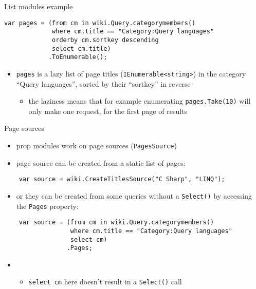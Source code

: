 \documentclass{beamer}
\begin{document}
\begin{frame}[fragile]{List modules example}
\begin{adjustbox}{width=\textwidth,keepaspectratio}
\begin{lstlisting}
var pages = (from cm in wiki.Query.categorymembers()
             where cm.title == "Category:Query languages"
             orderby cm.sortkey descending
             select cm.title)
            .ToEnumerable();
\end{lstlisting}
\end{adjustbox}

\medskip

\begin{itemize}
\item \lstinline{pages} is a lazy list of page titles (\lstinline{IEnumerable<string>}) in the category ``Query languages'', sorted by their ``sortkey'' in reverse
\begin{itemize}
\item the laziness means that for example enumerating \lstinline{pages.Take(10)} will only make one request, for the first page of results
\end{itemize}
\end{itemize}
\end{frame}

\begin{frame}[fragile]{Page sources}
\begin{itemize}
\item prop modules work on page sources (\lstinline{PagesSource})
\item page source can be created from a static list of pages:
\end{itemize}
\begin{adjustbox}{scale=0.7}
\begin{lstlisting}
    var source = wiki.CreateTitlesSource("C Sharp", "LINQ");
\end{lstlisting}
\end{adjustbox}
\begin{itemize}
\item or they can be created from some queries without a \lstinline{Select()}
by accessing the \lstinline{Pages} property:
\end{itemize}
\begin{adjustbox}{scale=0.7}
\begin{lstlisting}
    var source = (from cm in wiki.Query.categorymembers()
                  where cm.title == "Category:Query languages"
                  select cm)
                 .Pages;
\end{lstlisting}
\end{adjustbox}
\begin{itemize}
\item[]
\begin{itemize}
\item \lstinline{select cm} here doesn't result in a \lstinline{Select()} call
\end{itemize}
\end{itemize}
\end{frame}
\end{document}
